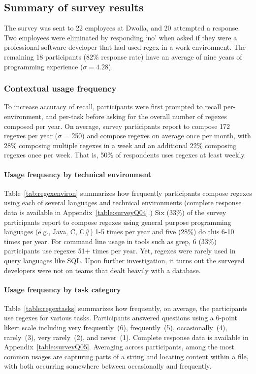 \subsection{Summary of survey results}
\label{sec:surveyResults}

The survey was sent to 22 employees at Dwolla, and 20 attempted a response.  Two employees were eliminated by responding `no' when asked if they were a professional software developer that had used regex in a work environment.  The remaining 18 participants (82\% response rate) have an average of nine years of programming experience ($\sigma = 4.28$).

\subsubsection{Contextual usage frequency}
\label{sec:compositionFrequency}
To increase accuracy of recall, participants were first prompted to recall per-environment, and per-task before asking for the overall number of regexes composed per year.  On average, survey participants report to compose 172 regexes per year ($\sigma$ = 250) and compose regexes on average once per month, with 28\% composing multiple regexes in a week and an additional 22\% composing regexes once per week. That is, 50\% of respondents uses regexes at least weekly.



\paragraph{Usage frequency by technical environment} Table~\ref{tab:regexenviron} summarizes how frequently participants compose regexes using each of several languages and technical environments (complete response data is available in Appendix~\ref{table:surveyQ04}.)  Six (33\%) of the survey participants report to compose regexes using general purpose programming languages (e.g., Java, C, C\#) 1-5 times per year and five (28\%) do this 6-10 times per year.  For command line usage in tools such as grep, 6 (33\%) participants use regexes 51+ times per year. Yet, regexes were rarely used in query languages like SQL. Upon further investigation, it turns out the surveyed developers were not on teams that dealt heavily with a database.



\paragraph{Usage frequency by task category} Table~\ref{table:regextasks} summarizes how frequently, on average, the participants use
regexes for various tasks.
Participants answered questions using a 6-point likert scale including very frequently~(6), frequently~(5), occasionally~(4), rarely~(3), very rarely~(2), and never~(1).  Complete response data is available in Appendix~\ref{table:surveyQ05}.  Averaging across participants, among the most common usages are capturing parts of a string and locating content within a file, with both occurring somewhere between occasionally and frequently.

